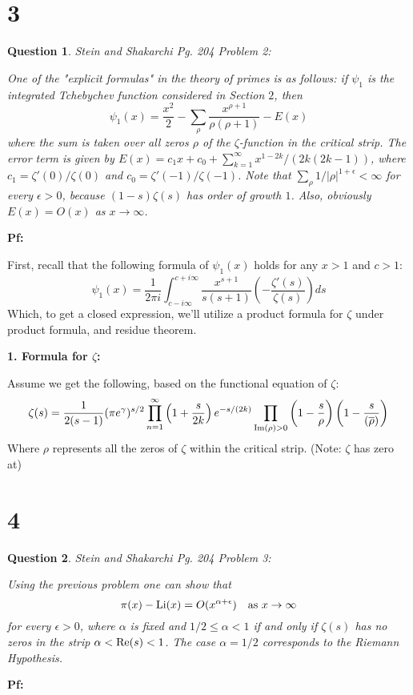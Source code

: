 \documentclass{article}
\newtheorem{question}{Question}
\begin{document}
\begin{itemize}
\end{itemize}

\break

\section*{3}
\begin{myBox}[]{}
    \begin{question}
        Stein and Shakarchi Pg. 204 Problem 2:

        One of the "explicit formulas" in the theory of primes is as follows: if $\psi_1$ is the integrated Tchebychev function considered in Section $2$, then 
        $$\psi_1(x)=\frac{x^2}{2}-\sum_{\rho}\frac{x^{\rho+1}}{\rho(\rho+1)}-E(x)$$
        where the sum is taken over all zeros $\rho$ of the $\zeta$-function in the critical strip. The error term is given by $E(x)=c_1x+c_0+\sum_{k=1}^{\infty}x^{1-2k}/(2k(2k-1))$, where $c_1=\zeta'(0)/\zeta(0)$ and $c_0=\zeta'(-1)/\zeta(-1)$. Note that $\sum_{\rho}1/|\rho|^{1+\epsilon}<\infty$ for every $\epsilon>0$, because $(1-s)\zeta(s)$ has order of growth $1$. Also, obviously $E(x)=O(x)$ as $x\rightarrow\infty$.
    \end{question}
\end{myBox}

\textbf{Pf:}

First, recall that the following formula of $\psi_1(x)$ holds for any $x>1$ and $c>1$:
$$\psi_1(x)=\frac{1}{2\pi i}\int_{c-i\infty}^{c+i\infty}\frac{x^{s+1}}{s(s+1)}\left(-\frac{\zeta'(s)}{\zeta(s)}\right)ds$$
Which, to get a closed expression, we'll utilize a product formula for $\zeta$ under product formula, and residue theorem.

\hfil

\textbf{1. Formula for $\zeta$:}

Assume we get the following, based on the functional equation of $\zeta$:
$$\zeta(s)=\frac{1}{2(s-1)}(\pi e^\gamma)^{s/2}\prod_{n=1}^{\infty}\left(1+\frac{s}{2k}\right)e^{-s/(2k)}\prod_{\textmd{Im}(\rho)>0}\left(1-\frac{s}{\rho}\right)\left(1-\frac{s}{(\overline{\rho})}\right)$$
Where $\rho$ represents all the zeros of $\zeta$ within the critical strip. (Note: $\zeta$ has zero at)  

\break

\section*{4}
\begin{myBox}[]{}
    \begin{question}
        Stein and Shakarchi Pg. 204 Problem 3:

        Using the previous problem one can show that 
        $$\pi(x)-\textmd{Li}(x)=O(x^{\alpha+\epsilon})\quad \textmd{as }x\rightarrow\infty$$
        for every $\epsilon>0$, where $\alpha$ is fixed and $1/2\leq \alpha<1$ if and only if $\zeta(s)$ has no zeros in the strip $\alpha<\textmd{Re}(s)<1$. The case $\alpha=1/2$ corresponds to the Riemann Hypothesis.     
    \end{question}
\end{myBox}

\textbf{Pf:}
\end{document}
